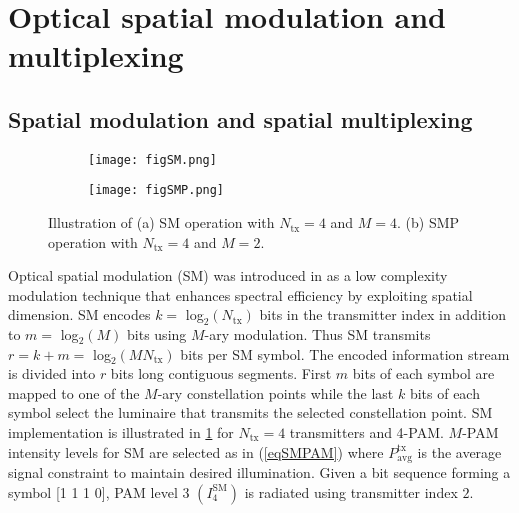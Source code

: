 \section{Optical spatial modulation and multiplexing}
\label{sec:osm}

\graphicspath{{_MIMOSpace/figures_osm/}}

\subsection{Spatial modulation and spatial multiplexing}
\label{subsec:osmSystem}

\begin{figure}[t]
	\centering
		\begin{subfigure}{0.49\textwidth}
		\centering
				\texttt{[image: figSM.png]}
		\caption{}
		\label{figSM}			
		\end{subfigure}
		\hfill
		\begin{subfigure}{0.49\textwidth}
		\centering
				\texttt{[image: figSMP.png]}
				\caption{}
				\label{figSMP}
		\end{subfigure}
\caption{Illustration of (a) SM operation with $N_{\text{tx}} = 4$ and $M = 4$. (b) SMP operation with $N_{\text{tx}} = 4$ and $M = 2$.}
	\label{fig:SpatialModulation}
\end{figure}

Optical spatial modulation (SM) was introduced in \cite{mes06a} as a low complexity modulation technique that enhances spectral efficiency by exploiting spatial dimension. SM encodes $k =$ log$^{ }_{2}(N_{\text{tx}})$ bits in the transmitter index in addition to $m=$ log$^{ }_{2}(M)$ bits using $M$-ary modulation. Thus SM transmits $r=k+m=$ log$^{ }_{2}(MN_{\text{tx}})$ bits per SM symbol. The encoded information stream is divided into $r$ bits long contiguous segments. First $m$ bits of each symbol are mapped to one of the $M$-ary constellation points while the last $k$ bits of each symbol select the luminaire that transmits the selected constellation point. SM implementation is illustrated in \figurename{ \ref{figSM}} for $N_{\text{tx}}=4$ transmitters and 4-PAM. $M$-PAM intensity levels for SM are selected as in (\ref{eqSMPAM}) where $P^{\text{tx}}_{\text{avg}}$ is the average signal constraint to maintain desired illumination. Given a bit sequence forming a symbol [1 1 1 0], PAM level 3 $(I_4^{\text{SM}})$ is radiated using transmitter index $2$.

